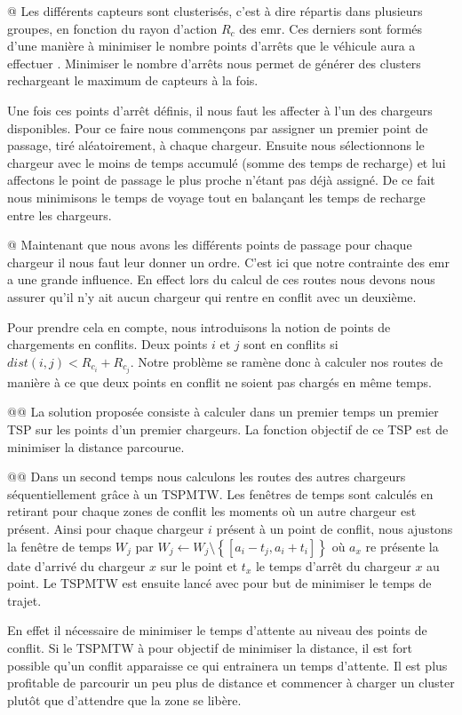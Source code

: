 \documentclass[noposter]{polytech}
\newcommand{\prive}[1]{\setminus\left\lbrace #1\right\rbrace}
\begin{document}
		\begin{easylist}
			@ Les différents capteurs sont clusterisés, c'est à dire répartis dans plusieurs groupes, en fonction du rayon d'action $R_c$ des \gls{emr}.
			Ces derniers sont formés d'une manière à minimiser le nombre points d'arrêts que le véhicule aura a effectuer \cite{KHELLADI201744}.
			Minimiser le nombre d'arrêts nous permet de générer des clusters rechargeant le maximum de capteurs à la fois.
			
			Une fois ces points d'arrêt définis, il nous faut les affecter à l'un des chargeurs disponibles.
			Pour ce faire nous commençons par assigner un premier point de passage, tiré aléatoirement, à chaque chargeur.
			Ensuite nous sélectionnons le chargeur avec le moins de temps accumulé (somme des temps de recharge) et lui affectons le point de passage le plus proche n'étant pas déjà assigné.
			De ce fait nous minimisons le temps de voyage tout en balançant les temps de recharge entre les chargeurs.
			
			@ Maintenant que nous avons les différents points de passage pour chaque chargeur il nous faut leur donner un ordre.
			C'est ici que notre contrainte des \gls{emr} a une grande influence.
			En effect lors du calcul de ces routes nous devons nous assurer qu'il n'y ait aucun chargeur qui rentre en conflit avec un deuxième.
			
			Pour prendre cela en compte, nous introduisons la notion de points de chargements en conflits.
			Deux points $i$ et $j$ sont en conflits si $dist\left(i,j\right)<R_{c_i}+R_{c_j}$.
			Notre problème se ramène donc à calculer nos routes de manière à ce que deux points en conflit ne soient pas chargés en même temps.
			
			@@ La solution proposée consiste à calculer dans un premier temps un premier TSP sur les points d'un premier chargeurs.
			La fonction objectif de ce TSP est de minimiser la distance parcourue.
			
			@@ Dans un second temps nous calculons les routes des autres chargeurs séquentiellement grâce à un TSPMTW.
			Les fenêtres de temps sont calculés en retirant pour chaque zones de conflit les moments où un autre chargeur est présent.
			Ainsi pour chaque chargeur $i$ présent à un point de conflit, nous ajustons la fenêtre de temps $W_j$ par $W_j\leftarrow W_j\prive{\left[a_i-t_j, a_i+t_i\right]}$ où $a_x$ re présente la date d'arrivé du chargeur $x$ sur le point et $t_x$ le temps d'arrêt du chargeur $x$ au point.
			Le TSPMTW est ensuite lancé avec pour but de minimiser le temps de trajet.
			
			En effet il nécessaire de minimiser le temps d'attente au niveau des points de conflit.
			Si le TSPMTW à pour objectif de minimiser la distance, il est fort possible qu'un conflit apparaisse ce qui entrainera un temps d'attente.
			Il est plus profitable de parcourir un peu plus de distance et commencer à charger un cluster plutôt que d'attendre que la zone se libère.
		\end{easylist}
		
\end{document}

